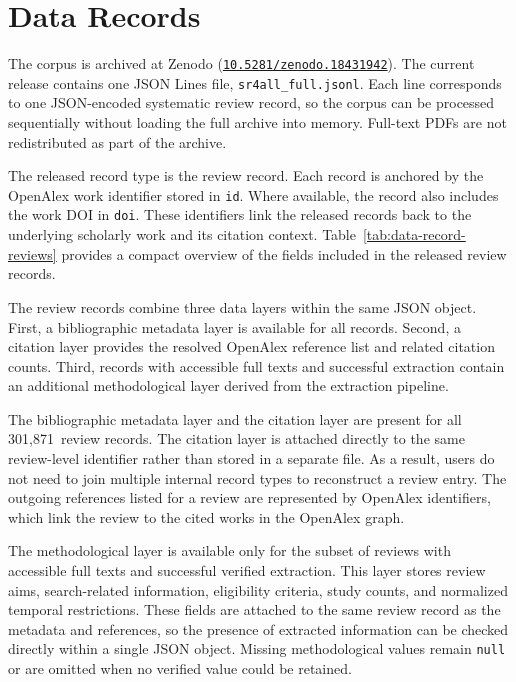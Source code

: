 \section*{Data Records}

The \webisSRCorpus{} corpus is archived at Zenodo (\href{https://doi.org/10.5281/zenodo.18431942}{\texttt{10.5281/zenodo.18431942}}). The current release contains one JSON Lines file, \texttt{sr4all\_full.jsonl}. Each line corresponds to one JSON-encoded systematic review record, so the corpus can be processed sequentially without loading the full archive into memory. Full-text PDFs are not redistributed as part of the archive.

The released record type is the review record. Each record is anchored by the OpenAlex work identifier stored in \texttt{id}. Where available, the record also includes the work DOI in \texttt{doi}. These identifiers link the released records back to the underlying scholarly work and its citation context. Table~\ref{tab:data-record-reviews} provides a compact overview of the fields included in the released review records.

The review records combine three data layers within the same JSON object. First, a bibliographic metadata layer is available for all records. Second, a citation layer provides the resolved OpenAlex reference list and related citation counts. Third, records with accessible full texts and successful extraction contain an additional methodological layer derived from the extraction pipeline.

The bibliographic metadata layer and the citation layer are present for all 301,871~review records. The citation layer is attached directly to the same review-level identifier rather than stored in a separate file. As a result, users do not need to join multiple internal record types to reconstruct a review entry. The outgoing references listed for a review are represented by OpenAlex identifiers, which link the review to the cited works in the OpenAlex graph.

The methodological layer is available only for the subset of reviews with accessible full texts and successful verified extraction. This layer stores review aims, search-related information, eligibility criteria, study counts, and normalized temporal restrictions. These fields are attached to the same review record as the metadata and references, so the presence of extracted information can be checked directly within a single JSON object. Missing methodological values remain \texttt{null} or are omitted when no verified value could be retained.


